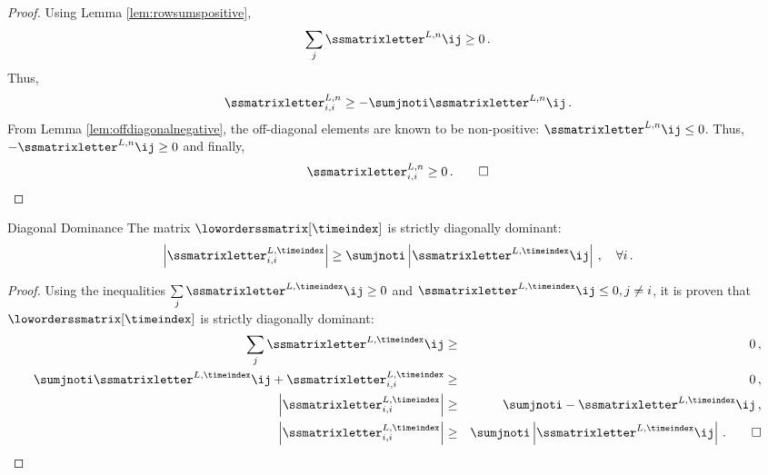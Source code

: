\begin{prf}
\begin{proof}
Using Lemma \ref{lem:rowsumspositive},
\[
  \sumj \ssmatrixletter^{L,n}\ij \ge 0 \eqp
\]
Thus,
\[
  \ssmatrixletter^{L,n}_{i,i} \ge -\sumjnoti \ssmatrixletter^{L,n}\ij \eqp
\]
From Lemma \ref{lem:offdiagonalnegative}, the off-diagonal elements are known
to be non-positive: $\ssmatrixletter^{L,n}\ij \leq 0$. Thus,
$-\ssmatrixletter^{L,n}\ij \geq 0$ and finally,
\[
  \ssmatrixletter^{L,n}_{i,i} \ge 0 \eqp \qed
\]
\end{proof}
\begin{lemma}{Diagonal Dominance}
   The matrix $\loworderssmatrix[\timeindex]$ is strictly diagonally dominant:
   \[
     \left|\ssmatrixletter^{L,\timeindex}_{i,i}\right|
     \ge \sumjnoti \left|\ssmatrixletter^{L,\timeindex}\ij\right|
     \eqc \quad \forall i\eqp
   \]
\end{lemma}
\begin{proof}
Using the inequalities $\sumj \ssmatrixletter^{L,\timeindex}\ij \ge 0$ and
$\ssmatrixletter^{L,\timeindex}\ij\le 0, j\ne i$, it is proven that
$\loworderssmatrix[\timeindex]$ is strictly diagonally dominant:
\begin{eqnarray*}
  \sumj     \ssmatrixletter^{L,\timeindex}\ij       & \ge & 0 \eqc\\
  \sumjnoti \ssmatrixletter^{L,\timeindex}\ij
    + \ssmatrixletter^{L,\timeindex}_{i,i} & \ge & 0 \eqc\\
  \left|\ssmatrixletter^{L,\timeindex}_{i,i}\right| & \ge &
    \sumjnoti -\ssmatrixletter^{L,\timeindex}\ij
    \eqc\\
  \left|\ssmatrixletter^{L,\timeindex}_{i,i}\right| & \ge
    & \sumjnoti \left|\ssmatrixletter^{L,\timeindex}\ij\right| \eqp \qed
\end{eqnarray*}
\end{proof}

\end{prf}
